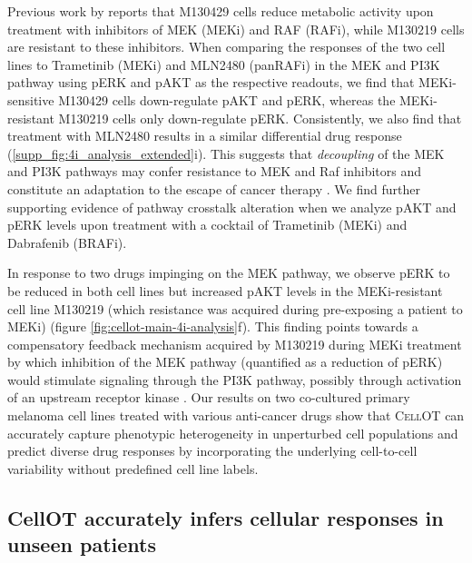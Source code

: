 Previous work by \citet{smith2016inhibiting} reports that M130429 cells reduce metabolic activity %
upon treatment with inhibitors of MEK (MEKi) and RAF (RAFi), while M130219 cells are resistant to these inhibitors.
When comparing the responses of the two cell lines to Trametinib (MEKi) and MLN2480 (panRAFi) in the MEK and PI3K pathway using pERK and pAKT as the respective readouts, we find that MEKi-sensitive M130429 cells down-regulate pAKT and pERK, whereas the MEKi-resistant M130219 cells only down-regulate pERK.
Consistently, we also find that treatment with MLN2480 results in a similar differential drug response (\ref{supp_fig:4i_analysis_extended}i).
This suggests that \textit{decoupling} of the MEK and PI3K pathways may confer resistance to MEK and Raf inhibitors and constitute an adaptation to the escape of cancer therapy \cite{kun2021mek}.
We find further supporting evidence of pathway crosstalk alteration when we analyze pAKT and pERK levels upon treatment with a cocktail of Trametinib (MEKi) and Dabrafenib (BRAFi). 

In response to two drugs impinging on the MEK pathway, we observe pERK to be reduced in both cell lines but increased pAKT levels in the MEKi-resistant cell line M130219 (which resistance was acquired during pre-exposing a patient to MEKi) (figure \ref{fig:cellot-main-4i-analysis}f).
This finding points towards a compensatory feedback mechanism acquired by M130219 during MEKi treatment by which inhibition of the MEK pathway (quantified as a reduction of pERK) would stimulate signaling through the PI3K pathway, possibly through activation of an upstream receptor kinase \cite{caunt2015mek1}. 
Our results on two co-cultured primary melanoma cell lines treated with various anti-cancer drugs show that \textsc{CellOT} can accurately capture phenotypic heterogeneity in unperturbed cell populations and predict diverse drug responses by incorporating the underlying cell-to-cell variability without predefined cell line labels. 

\subsection{CellOT accurately infers cellular responses in unseen patients}

